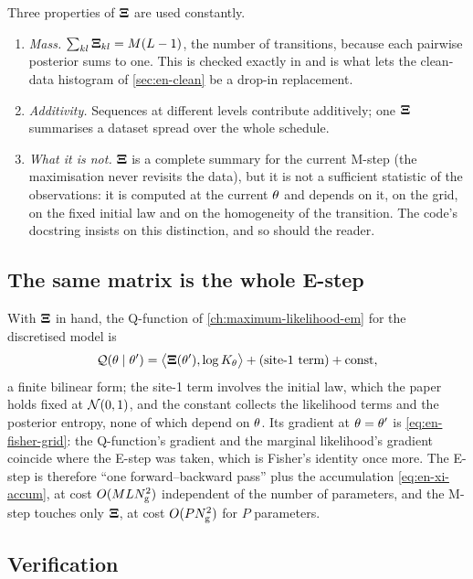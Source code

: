 Three properties of $\mathbf{\Xi}$ are used constantly.
\begin{enumerate}
\item \emph{Mass.} $\sum_{kl}\mathbf{\Xi}_{kl}=M(L-1)$, the number of transitions,
because each pairwise posterior sums to one. This is checked exactly in
 and is what lets the clean-data histogram of
\cref{sec:en-clean} be a drop-in replacement.
\item \emph{Additivity.} Sequences at different levels contribute additively; one
$\mathbf{\Xi}$ summarises a dataset spread over the whole schedule.
\item \emph{What it is not.} $\mathbf{\Xi}$ is a complete summary for the current M-step (the
maximisation never revisits the data), but it is not a sufficient statistic of the
observations: it is computed at the current $\theta$ and depends on it, on the grid,
on the fixed initial law and on the homogeneity of the transition. The code's
docstring insists on this distinction, and so should the reader.
\end{enumerate}

\subsection{The same matrix is the whole E-step}

With $\mathbf{\Xi}$ in hand, the Q-function of \cref{ch:maximum-likelihood-em} for the
discretised model is
\begin{equation}
  \mathcal{Q}(\theta\mid\theta')=\bigl\langle\mathbf{\Xi}(\theta'),\log K_{\theta}\bigr\rangle+\text{(site-1 term)}+\text{const},
  \label{eq:en-Q}
\end{equation}
a finite bilinear form; the site-1 term involves the initial law, which the paper
holds fixed at $\mathcal{N}\!\left(0,1\right)$, and the constant collects the likelihood terms and the
posterior entropy, none of which depend on $\theta$. Its gradient at $\theta=\theta'$
is \cref{eq:en-fisher-grid}: the Q-function's gradient and the marginal likelihood's
gradient coincide where the E-step was taken, which is Fisher's identity once more.
The E-step is therefore ``one forward--backward pass'' plus the accumulation
\cref{eq:en-xi-accum}, at cost $O(MLN_{\mathrm{g}}^2)$ independent of the number of
parameters, and the M-step touches only $\mathbf{\Xi}$, at cost $O(PN_{\mathrm{g}}^2)$ for $P$
parameters.

\subsection{Verification}

